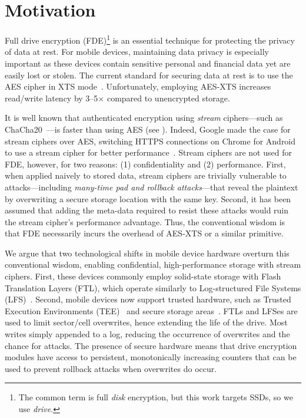 \section{Motivation} \label{sec:sb-motivation}

Full drive encryption (FDE)\footnote{The common term is full \emph{disk}
encryption, but this work targets SSDs, so we use \emph{drive}.} is an essential
technique for protecting the privacy of data at rest. For mobile devices,
maintaining data privacy is especially important as these devices contain
sensitive personal and financial data yet are easily lost or stolen. The current
standard for securing data at rest is to use the AES cipher in XTS
mode~\cite{XTS, NISTXTS}. Unfortunately, employing AES-XTS increases read/write
latency by 3--5$\times$ compared to unencrypted storage.

It is well known that authenticated encryption using \emph{stream}
ciphers---such as ChaCha20~\cite{ChaCha20}---is faster than using AES (see
). Indeed, Google made the case for stream ciphers over AES,
switching HTTPS connections on Chrome for Android to use a stream cipher for
better performance~\cite{google-blog}. Stream ciphers are not used for FDE,
however, for two reasons: (1) confidentiality and (2) performance. First, when
applied naively to stored data, stream ciphers are trivially vulnerable to
attacks---including \emph{many-time pad and rollback attacks}---that reveal the
plaintext by overwriting a secure storage location with the same key. Second, it
has been assumed that adding the meta-data required to resist these attacks
would ruin the stream cipher's performance advantage. Thus, the conventional
wisdom is that FDE necessarily incurs the overhead of AES-XTS or a similar
primitive.

We argue that two technological shifts in mobile device hardware overturn this
conventional wisdom, enabling confidential, high-performance storage with stream
ciphers. First, these devices commonly employ solid-state storage with Flash
Translation Layers (FTL), which operate similarly to Log-structured File Systems
(LFS)~\cite{LFS,F2FS,NILFS}. Second, mobile devices now support trusted
hardware, such as Trusted Execution Environments (TEE)~\cite{TEE,TrustZone} and
secure storage areas~\cite{eMMC-standard}. FTLs and LFSes are used to limit
sector/cell overwrites, hence extending the life of the drive. Most writes
simply appended to a log, reducing the occurrence of overwrites and the chance
for attacks. The presence of secure hardware means that drive encryption modules
have access to persistent, monotonically increasing counters that can be used to
prevent rollback attacks when overwrites do occur.

